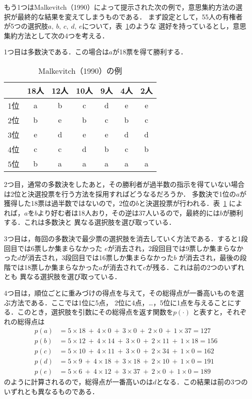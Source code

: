 \documentclass[dvipdfmx]{jsarticle}
\begin{document}
もう1つはMalkevitch（1990）によって提示された次の例で，意思集約方法の選択が最終的な結果を変えてしまうものである．
まず設定として，55人の有権者が5つの選択肢$a,\ b,\ c,\ d,\ e$について，表~\ref{tab:Malkevitch}のような
選好を持っているとし，意思集約方法として次の4つを考える．

1つ目は多数決である．この場合は$a$が18票を得て勝利する．

\begin{table}[h]
  \caption{Malkevitch（1990）の例}\label{tab:Malkevitch}
  \begin{center}
    \begin{tabular}{c|c|c|c|c|c|c}
      & 18人 & 12人 & 10人 & 9人 & 4人 & 2人 \\ \hline
    1位 & a & b & c & d & e & e \\
    2位 & b & e & b & c & b & c \\
    3位 & e & d & e & e & d & d \\
    4位 & c & c & d & b & c & b \\
    5位 & b & a & a & a & a & a \\
\end{tabular}
  \end{center}
\end{table}

2つ目，通常の多数決をしたあと，その勝利者が過半数の指示を得ていない場合は2位と決選投票を行う方法を採用すればどうなるだろうか．
多数決で1位の$a$が獲得した18票は過半数ではないので，2位の$b$と決選投票が行われる．表~\ref{tab:Malkevitch}
によれば，$a$を$b$より好む者は18人おり，その逆は37人いるので，最終的には$b$が勝利する．これは多数決と
異なる選択肢を選び取っている．

3つ目は，毎回の多数決で最少票の選択肢を消去していく方法である．すると1段回目では6票しか集まらなかった
$e$が消去され，2段回目では9票しか集まらなかった$d$が消去され，3段回目では16票しか集まらなかった$b$
が消去され，最後の段階では18票しか集まらなかった$a$が消去されて$c$が残る．これは前の2つのいずれとも
異なる選択肢を選び取っている．

4つ目は，順位ごとに重みづけの得点を与えて，その総得点が一番高いものを選ぶ方法である．ここでは1位に5点，
2位に4点，\ldots，5位に1点を与えることにする．このとき，選択肢を引数にその総得点を返す関数を$p(\cdot)$
と表すと，それぞれの総得点は
\begin{align*}
  p(a) &= 5 \times 18 \ +\  4 \times 0 \ +\ 3 \times 0 \ +\  2 \times 0\ +\ 1 \times 37 = 127 \\
  p(b) &= 5 \times 12 \ +\  4 \times 14 \ +\ 3 \times 0 \ +\  2 \times 11 \ +\ 1 \times 18 = 156 \\
  p(c) &= 5 \times 10 \ +\  4 \times 11 \ +\ 3 \times 0 \ +\  2 \times 34 \ +\ 1 \times 0 = 162 \\
  p(d) &= 5 \times 9 \ +\  4 \times 18 \ +\ 3 \times 18 \ +\  2 \times 10 \ +\ 1 \times 0 = 191 \\
  p(e) &= 5 \times 6 \ +\  4 \times 12 \ +\ 3 \times 37 \ +\  2 \times 0 \ +\ 1 \times 0 = 189
\end{align*}
のように計算されるので，総得点が一番高いのは$d$となる．この結果は前の3つのいずれとも異なるものである．
\end{document}
